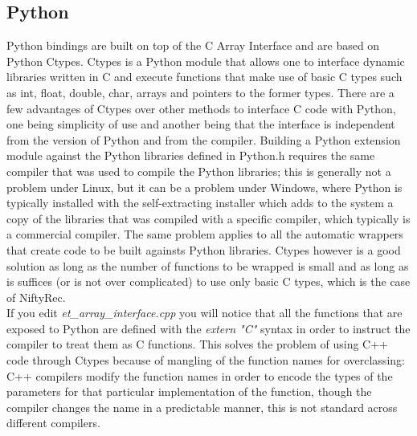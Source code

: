 \documentclass[12pt,a4paper]{report}
\begin{document}
\subsection{Python}
Python bindings are built on top of the C Array Interface and are based on Python Ctypes. 
Ctypes is a Python module that allows one to interface dynamic libraries written in C and 
execute functions that make use of basic C types such as int, float, double, char, arrays and pointers to the 
former types. There are a few advantages of Ctypes over other methods to interface C code with Python, one being simplicity of 
use and another being that the interface is independent from the version of Python and from the compiler. 
Building a Python extension module against the Python libraries defined in Python.h requires the same compiler that 
was used to compile the Python libraries; this is generally not a problem under Linux, but it can be a problem 
under Windows, where Python is typically installed with the self-extracting installer which adds to the system a 
copy of the libraries that was compiled with a specific compiler, which typically is a commercial compiler. 
The same problem applies to all the automatic wrappers that create code to be built againsts Python libraries. 
Ctypes however is a good solution as long as the number of functions to be wrapped is small and as long as is suffices 
(or is not over complicated) to use only basic C types, which is the case of NiftyRec.\\

If you edit \emph{et\_array\_interface.cpp} you will notice that all the functions that are exposed to Python are defined with 
the \emph{extern "C"} syntax in order to instruct the compiler to treat them as C functions. This solves the 
problem of using C++ code through Ctypes because of mangling of the function names for overclassing: C++ compilers modify 
the function names in order to encode the types of the parameters for that particular implementation of the function, though 
the compiler changes the name in a predictable manner, this is not standard across different compilers. \\
\end{document}
